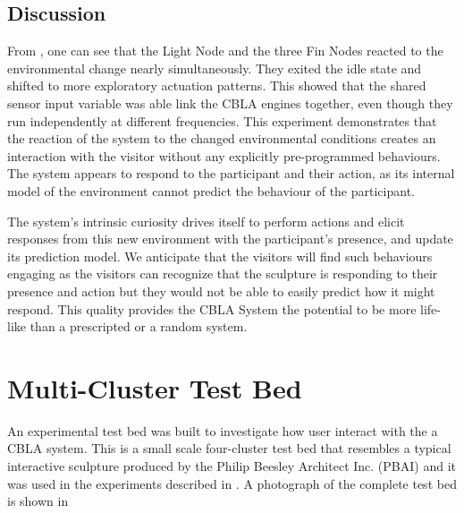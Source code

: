\subsection{Discussion}

From , one can see that the Light Node and the three Fin Nodes reacted to the environmental change nearly simultaneously. They exited the idle state and shifted to more exploratory actuation patterns. This showed that the shared sensor input variable was able link the CBLA engines together, even though they run independently at different frequencies. This experiment demonstrates that the reaction of the system to the changed environmental conditions creates an interaction with the visitor without any explicitly pre-programmed behaviours. The system appears to respond to the participant and their action, as its internal model of the environment cannot predict the behaviour of the participant. 

The system's intrinsic curiosity drives itself to perform actions and elicit responses from this new environment with the participant's presence, and update its prediction model. We anticipate that the visitors will find such behaviours engaging as the visitors can recognize that the sculpture is responding to their presence and action but they would not be able to easily predict how it might respond. This quality provides the CBLA System the potential to be more life-like than a prescripted or a random system. 


\section{Multi-Cluster Test Bed}\label{sec:multi-cluster-test-bed}

An experimental test bed was built to investigate how user interact with the a CBLA system. This is a small scale four-cluster test bed that resembles a typical interactive sculpture produced by the Philip Beesley Architect Inc. (PBAI) and it was used in the experiments described in . A photograph of the complete test bed is shown in 

